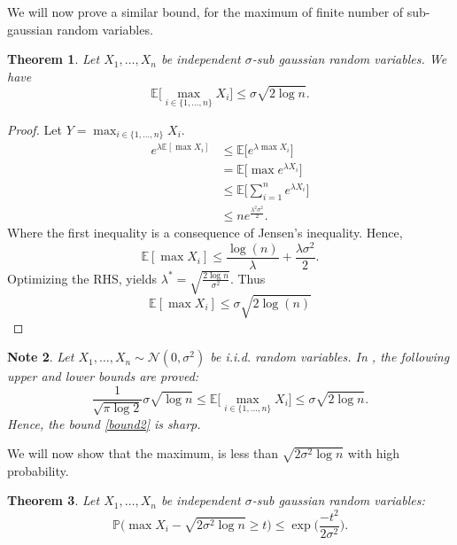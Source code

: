 \documentclass[]{article}
\newtheorem{theorem}{Theorem}
\newtheorem{note}[theorem]{Note}
\newcommand{\E}{\mathbb{E}}
\begin{document}
\noindent
We will now prove a similar bound, for the maximum of finite number of sub-gaussian random variables.

\begin{theorem}
	\label{bound2}
	Let $X_1, \dots, X_n$ be independent $\sigma$-sub gaussian random variables. We have
	\begin{equation}
		\E \big[\max_{i\in\{1, \dots, n\}} X_i\big] \leq \sigma\sqrt{2\log n}.
	\end{equation}
\end{theorem}

\begin{proof}
	Let $Y =  \max_{i\in\{1, \dots, n\}} X_i$.
	\begin{align*}
		e^{\lambda \E[\max X_i]} &\leq \E\Big[e^{\lambda \max X_i}\Big] \\
		&= \E\Big[\max e^{\lambda X_i}\Big]\\
		&\leq \E\Bigg[\sum_{i = 1}^{n} e^{\lambda X_i} \Bigg]\\
		&\leq n e^{\frac{\lambda^2\sigma^2}{2}}.
	\end{align*}
	Where the first inequality is a consequence of Jensen's inequality.
	Hence, 
	\begin{equation*}
		\E[\max X_i] \leq \frac{\log(n)}{\lambda} + \frac{\lambda \sigma^2}{2}.
	\end{equation*}
	Optimizing the RHS, yields
	$\lambda^* = \sqrt{\frac{2\log n}{\sigma^2}}$. Thus
	\begin{equation*}
		\E[\max X_i] \leq \sigma \sqrt{2\log(n)}
	\end{equation*}
	
	
\end{proof}


\begin{note}
	Let $X_1, \dots, X_n \sim \mathcal{N}(0, \sigma^2)$ be i.i.d. random variables. In \cite{gautam}, the following upper and lower bounds are proved:
	\begin{equation}
		\frac{1}{\sqrt{\pi\log 2}} \sigma \sqrt{\log n} \leq \E \big[\max_{i\in\{1, \dots, n\}} X_i\big] \leq  \sigma \sqrt{2\log n}.
	\end{equation}		
	Hence, the bound \eqref{bound2} is sharp.
\end{note}


\noindent
We will now show that the maximum, is less than $\sqrt{2\sigma^2\log n}$ with high probability.

\begin{theorem}
	Let $X_1, \dots, X_n$ be independent $\sigma$-sub gaussian random variables:
	\begin{equation}
		\mathbb{P}\Big(\max X_i -\sqrt{2\sigma^2\log n} \geq t\Big) \leq \exp\bigg(\frac{-t^2}{2\sigma^2}\bigg).
	\end{equation}
\end{theorem}
\end{document}

